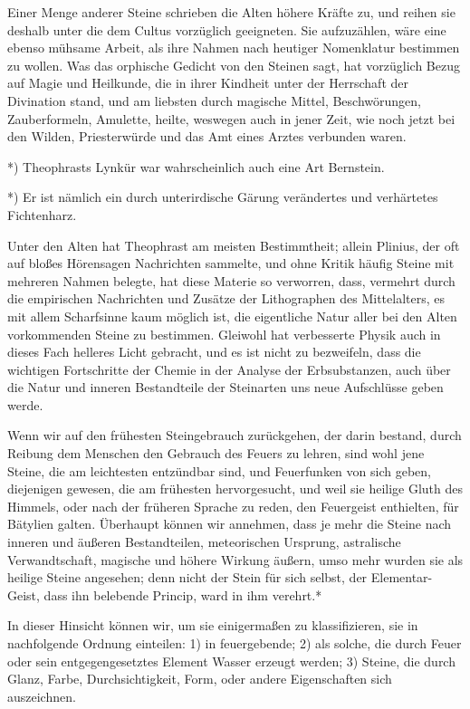 \documentclass[a4paper, 11pt, oneside, polutonikogreek, german]{article}
\begin{document}
Einer Menge anderer Steine schrieben die Alten höhere Kräfte zu, und reihen sie deshalb unter die dem Cultus vorzüglich geeigneten. Sie aufzuzählen, wäre eine ebenso mühsame Arbeit, als ihre Nahmen nach heutiger Nomenklatur bestimmen zu wollen. Was das orphische Gedicht von den Steinen sagt, hat vorzüglich Bezug auf Magie und Heilkunde, die in ihrer Kindheit unter der Herrschaft der Divination stand, und am liebsten durch magische Mittel, Beschwörungen, Zauberformeln, Amulette, heilte, weswegen auch in jener Zeit, wie noch jetzt bei den Wilden, Priesterwürde und das Amt eines Arztes verbunden waren.

*) Theophrasts Lynkür war wahrscheinlich auch eine Art Bernstein.

*) Er ist nämlich ein durch unterirdische Gärung verändertes und verhärtetes Fichtenharz.

Unter den Alten hat Theophrast am meisten Bestimmtheit; allein Plinius, der oft auf bloßes Hörensagen Nachrichten sammelte, und ohne Kritik häufig Steine mit mehreren Nahmen belegte, hat diese Materie so verworren, dass, vermehrt durch die empirischen Nachrichten und Zusätze der Lithographen des Mittelalters, es mit allem Scharfsinne kaum möglich ist, die eigentliche Natur aller bei den Alten vorkommenden Steine zu bestimmen. Gleiwohl hat verbesserte Physik auch in dieses Fach helleres Licht gebracht, und es ist nicht zu bezweifeln, dass die wichtigen Fortschritte der Chemie in der Analyse der Erbsubstanzen, auch über die Natur und inneren Bestandteile der Steinarten uns neue Aufschlüsse geben werde.

Wenn wir auf den frühesten Steingebrauch zurückgehen, der darin bestand, durch Reibung dem Menschen den Gebrauch des Feuers zu lehren, sind wohl jene Steine, die am leichtesten entzündbar sind, und Feuerfunken von sich geben, diejenigen gewesen, die am frühesten hervorgesucht, und weil sie heilige Gluth des Himmels, oder nach der früheren Sprache zu reden, den Feuergeist enthielten, für Bätylien galten. Überhaupt können wir annehmen, dass je mehr die Steine nach inneren und äußeren Bestandteilen, meteorischen Ursprung, astralische Verwandtschaft, magische und höhere Wirkung äußern, umso mehr wurden sie als heilige Steine angesehen; denn nicht der Stein für sich selbst, der Elementar-Geist, dass ihn belebende Princip, ward in ihm verehrt.*

In dieser Hinsicht können wir, um sie einigermaßen zu klassifizieren, sie in nachfolgende Ordnung einteilen: 1) in feuergebende; 2) als solche, die durch Feuer oder sein entgegengesetztes Element Wasser erzeugt werden; 3) Steine, die durch Glanz, Farbe, Durchsichtigkeit, Form, oder andere Eigenschaften sich auszeichnen.
\end{document}
